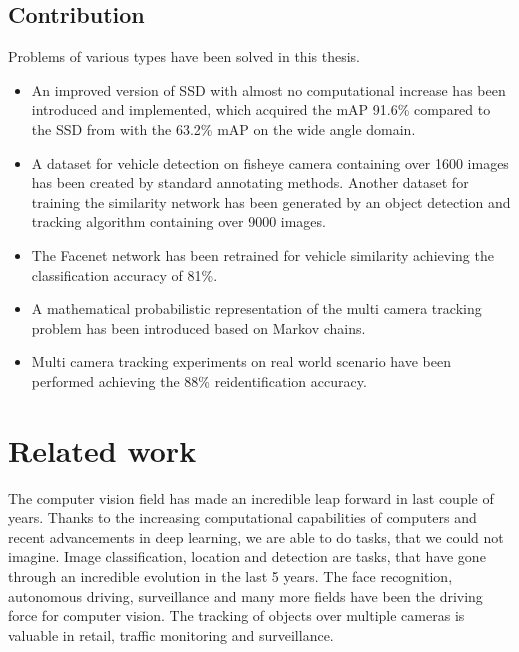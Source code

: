\documentclass[a4paper,12pt,titlepage, twoside]{article}
\numberwithin{figure}{section}
\begin{document}
\subsection{Contribution}

Problems of various types have been solved in this thesis. 

\begin{itemize}
\item An improved version of SSD \cite{liu2016ssd} with almost no computational increase has been introduced and implemented, which acquired the mAP 91.6\% compared to the SSD from \cite{liu2016ssd} with the 63.2\% mAP on the wide angle domain.

\item A dataset for vehicle detection on fisheye camera containing over 1600 images has been created by standard annotating methods. Another dataset for training the similarity network has been generated by an object detection and tracking algorithm containing over 9000 images.

\item The Facenet \cite{schroff2015facenet} network has been retrained for vehicle similarity achieving the classification accuracy of 81\%.

\item A mathematical probabilistic representation of the multi camera tracking problem has been introduced based on Markov chains.

\item Multi camera tracking experiments on real world scenario have been performed achieving the 88\% reidentification accuracy.

\end{itemize}

\clearpage
\section{Related work}
\label{sec:related_work}

The computer vision field has made an incredible leap forward in last couple of years. Thanks to the increasing computational capabilities of computers and recent advancements in deep learning, we are able to do tasks, that we could not imagine. Image classification, location and detection are tasks, that have gone through an incredible evolution in the last 5 years. The face recognition, autonomous driving, surveillance and many more fields have been the driving force for computer vision. The tracking of objects over multiple cameras is valuable in retail, traffic monitoring and surveillance. 
\end{document}
